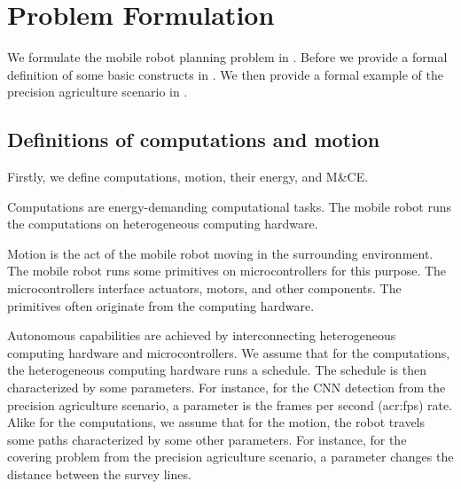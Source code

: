 \section{Problem Formulation}
\label{sec:pb-form}

We formulate the mobile robot planning problem in . Before we provide a formal definition of some basic constructs in . We then provide a formal example of the precision agriculture scenario in .

\subsection{Definitions of computations and motion}
\label{sec:definitions}

Firstly, we define computations, motion, their energy, and M\&CE.

\begin{highlight}
  \begin{defn}\label{def:comps}
    Computations are energy-demanding computational tasks. The mobile robot runs the computations on heterogeneous computing hardware.
    
    Motion is the act of the mobile robot moving in the surrounding environment. The mobile robot runs some primitives on microcontrollers for this purpose. The microcontrollers interface actuators, motors, and other components. The primitives often originate from the computing hardware.
  \end{defn}
\end{highlight}

Autonomous capabilities are achieved by interconnecting heterogeneous computing hardware and microcontrollers. We assume that for the computations, the heterogeneous computing hardware runs a schedule. The schedule is then characterized by some parameters. For instance, for the CNN detection from the precision agriculture scenario, a parameter is the frames per second (\Gls{acr:fps}) rate. Alike for the computations, we assume that for the motion, the robot travels some paths characterized by some other parameters. For instance, for the covering problem from the precision agriculture scenario, a parameter changes the distance between the survey lines.

